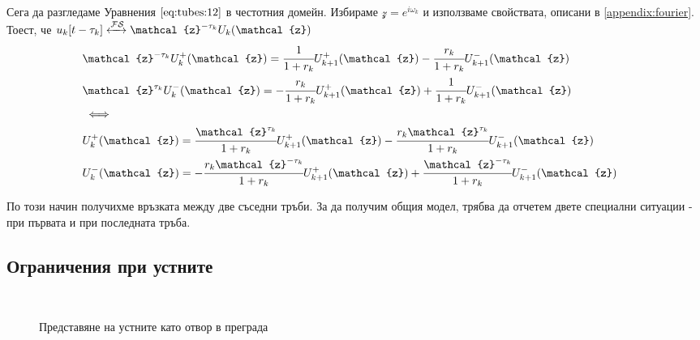 \documentclass[main.tex]{subfiles}
\begin{document}
Сега да разгледаме Уравнения $\eqref{eq:tubes:12}$ в честотния домейн. Избираме $\mathcal{z} = e^{i\omega_k}$ и използваме свойствата, описани в \autoref{appendix:fourier}. Тоест, че $u_k[t - \tau_k] \xleftrightarrow{\mathcal{F}\mathcal{S}} \mathcal{z}^{-\tau_k}U_k(\mathcal{z})$
\begin{subequations}
    \label{eq:tubes:13}
    \begin{flalign}
        & \nonumber \mathcal{z}^{-\tau_k}U_k^{+}(\mathcal{z}) = \cfrac{1}{1 + r_k} U_{k+1}^{+}(\mathcal{z}) - \cfrac{r_k}{1+r_k} U_{k+1}^{-}(\mathcal{z}) && \\
        & \nonumber \mathcal{z}^{\tau_k} U_k^{-}(\mathcal{z}) = - \cfrac{r_k}{1+r_k} U_{k+1}^{+}(\mathcal{z}) + \cfrac{1}{1 + r_k} U_{k+1}^{-}(\mathcal{z}) && \\
        & \iff && \\
        & U_k^{+}(\mathcal{z}) = \cfrac{\mathcal{z}^{\tau_k}}{1 + r_k} U_{k+1}^{+}(\mathcal{z}) - \cfrac{r_k\mathcal{z}^{\tau_k}}{1+r_k} U_{k+1}^{-}(\mathcal{z}) && \\
        & U_k^{-}(\mathcal{z}) = - \cfrac{r_k\mathcal{z}^{-\tau_k} }{1+r_k} U_{k+1}^{+}(\mathcal{z}) + \cfrac{\mathcal{z}^{-\tau_k} }{1 + r_k} U_{k+1}^{-}(\mathcal{z}) &&
    \end{flalign}
\end{subequations}

По този начин получихме връзката между две съседни тръби. За да получим общия модел, трябва да отчетем двете специални ситуации - при първата и при последната тръба.

\subsection{Ограничения при устните}\label{tubes:lips}

 	᠎
 	᠎ 

\begin{center}
\begin{figure}[ht]%
    \centering
    \begin{changemargin}{0cm}{0cm} 
        \hspace{0.2\paperwidth}
    \end{changemargin} 
    \caption{Представяне на устните като отвор в преграда}%
    \label{fig:tubes:3}
\end{figure}
\end{center}
\end{document}
